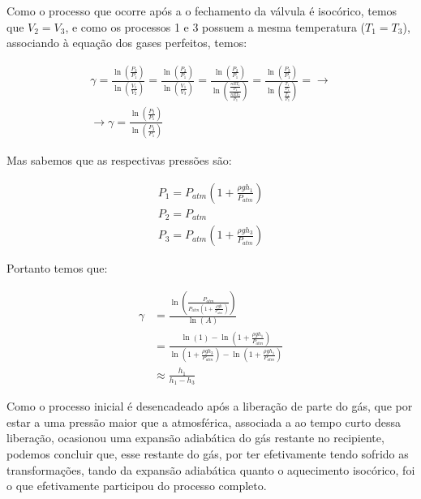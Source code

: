 \documentclass[a4paper]{ltxdoc}
\numberwithin{equation}{section}
\begin{document}
Como o processo que ocorre após a o fechamento da válvula é isocórico, temos que $V_2 = V_3$, e como os processos 1 e 3 possuem a mesma temperatura ($T_1 = T_3$), associando à equação dos gases perfeitos, temos:

\begin{align}
    \gamma = \frac {\ln \left ( \frac{P_2}{P_1} \right )}{\ln \left ( \frac{V_1}{V_2} \right ) } 
    = \frac {\ln \left ( \frac{P_2}{P_1} \right )}{\ln \left ( \frac{V_1}{V_3} \right ) } 
    = \frac {\ln \left ( \frac{P_2}{P_1} \right )}{\ln \left ( \frac{ \frac{nRT_1}{P_1} }{\frac{nRT_3}{P_3}} \right ) } 
     = \frac {\ln \left ( \frac{P_2}{P_1} \right )}{\ln \left ( \frac{ \frac{T_1}{P_1} }{\frac{T_1}{P_3}} \right ) } = \rightarrow{} \\
    \rightarrow{} \gamma= \frac {\ln \left ( \frac{P_2}{P_1} \right )}{\ln \left ( \frac{P_3}{P_1} \right ) }
\end{align}


Mas sabemos que as respectivas pressões são:

\begin{align}
    P_1 = P_{atm} \left ( 1 + \frac{\rho g h_1}{P_{atm}}\right  )\\
    P_2 = P_{atm}\\
    P_3 = P_{atm} \left ( 1 + \frac{\rho g h_3}{P_{atm}}\right  )
\end{align}

Portanto temos que:

\begin{align}
    \gamma &= \frac{ \ln \left ( \frac{P_{atm}}{P_{atm} \left ( 1+\frac{\rho g h}{P_{atm}} \right) } \right ) }{ \ln \left ( A \right )} \\
    &= \frac{ \ln(1) - \ln \left ( 1+\frac{\rho g h_1}{P_{atm}} \right ) }{\ln \left ( 1+\frac{\rho g h_3}{P_{atm}}\right )-\ln \left ( 1+\frac{\rho g h_1}{P_{atm}}\right )} \\
    &\approx \frac{h_1}{h_1 - h_3}
\end{align}


\vspace{\baselineskip}

Como o processo inicial é desencadeado após a liberação de parte do gás, que por estar a uma pressão maior que a atmosférica, associada a ao tempo curto dessa liberação, ocasionou uma expansão adiabática do gás restante no recipiente, podemos concluir que, esse restante do gás, por ter efetivamente tendo sofrido as transformações, tando da expansão adiabática quanto o aquecimento isocórico, foi o que efetivamente participou do processo completo.
\end{document}
